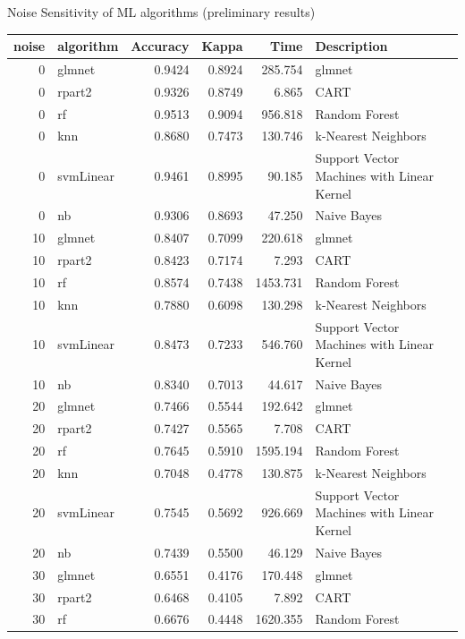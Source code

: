 \documentclass{beamer}\usepackage[]{graphicx}\usepackage[]{color}
\newenvironment{knitrout}{}{} %
\begin{document}
\begin{frame}[fragile]{Noise Sensitivity of ML algorithms (preliminary results)}
\Tiny
\begin{knitrout}
\color{fgcolor}
\begin{tabular}{r|l|r|r|r|l}
\hline
noise & algorithm & Accuracy & Kappa & Time & Description\\
\hline
0 & glmnet & 0.9424 & 0.8924 & 285.754 & glmnet\\
\hline
0 & rpart2 & 0.9326 & 0.8749 & 6.865 & CART\\
\hline
0 & rf & 0.9513 & 0.9094 & 956.818 & Random Forest\\
\hline
0 & knn & 0.8680 & 0.7473 & 130.746 & k-Nearest Neighbors\\
\hline
0 & svmLinear & 0.9461 & 0.8995 & 90.185 & Support Vector Machines with Linear Kernel\\
\hline
0 & nb & 0.9306 & 0.8693 & 47.250 & Naive Bayes\\
\hline
10 & glmnet & 0.8407 & 0.7099 & 220.618 & glmnet\\
\hline
10 & rpart2 & 0.8423 & 0.7174 & 7.293 & CART\\
\hline
10 & rf & 0.8574 & 0.7438 & 1453.731 & Random Forest\\
\hline
10 & knn & 0.7880 & 0.6098 & 130.298 & k-Nearest Neighbors\\
\hline
10 & svmLinear & 0.8473 & 0.7233 & 546.760 & Support Vector Machines with Linear Kernel\\
\hline
10 & nb & 0.8340 & 0.7013 & 44.617 & Naive Bayes\\
\hline
20 & glmnet & 0.7466 & 0.5544 & 192.642 & glmnet\\
\hline
20 & rpart2 & 0.7427 & 0.5565 & 7.708 & CART\\
\hline
20 & rf & 0.7645 & 0.5910 & 1595.194 & Random Forest\\
\hline
20 & knn & 0.7048 & 0.4778 & 130.875 & k-Nearest Neighbors\\
\hline
20 & svmLinear & 0.7545 & 0.5692 & 926.669 & Support Vector Machines with Linear Kernel\\
\hline
20 & nb & 0.7439 & 0.5500 & 46.129 & Naive Bayes\\
\hline
30 & glmnet & 0.6551 & 0.4176 & 170.448 & glmnet\\
\hline
30 & rpart2 & 0.6468 & 0.4105 & 7.892 & CART\\
\hline
30 & rf & 0.6676 & 0.4448 & 1620.355 & Random Forest\\

\end{tabular}
\end{knitrout}
\end{frame}
\end{document}
